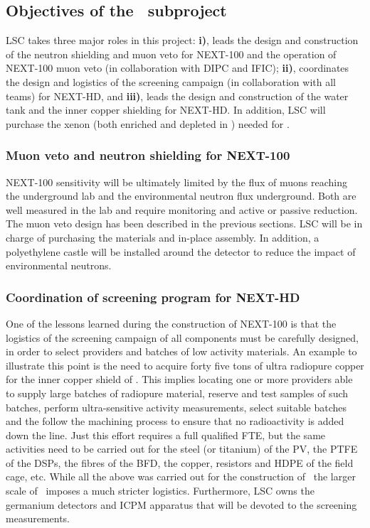 \subsection{Objectives of the \sLSC\ subproject}
\label{sec.obj.lsc}

LSC takes three major roles in this project: {\bf i)},  leads the design and construction of the neutron shielding and muon veto 
for NEXT-100 and the operation of NEXT-100 muon veto (in collaboration with DIPC and IFIC); {\bf ii)}, coordinates the design and logistics of the 
screening campaign (in collaboration with all teams) for NEXT-HD, and {\bf iii)}, leads the design
and construction of the water tank and the inner copper shielding for NEXT-HD. In addition, LSC will 
purchase the xenon (both enriched and depleted  in \XE) needed for \NHD. 

\subsubsection*{Muon veto and neutron shielding for NEXT-100}

NEXT-100 sensitivity will be ultimately limited by the flux of muons reaching the underground lab and the environmental neutron flux 
underground. Both are well measured in the lab and require monitoring and active or passive reduction. The muon veto design has been described in the previous sections. LSC will be in charge of purchasing the materials and in-place assembly. In addition, a polyethylene castle will be installed around the 
detector to reduce the impact of environmental neutrons.

\subsubsection*{Coordination of screening program for NEXT-HD}

One of the lessons learned during the construction of NEXT-100 is that the logistics of the screening campaign of all components must be carefully designed, in order to select providers and batches of low activity materials. An example to illustrate this point is the need to acquire forty five tons of ultra radiopure copper for the inner copper shield of \NHD. This implies locating one or more providers able to supply large batches of radiopure material, reserve and test samples of such batches, perform ultra-sensitive activity measurements, select suitable batches and the follow the machining process to ensure that no radioactivity is added down the line. Just this effort requires a full qualified FTE, but the same activities need to be carried out for the steel (or titanium) of the PV, the PTFE of the DSPs, the fibres of the BFD, the copper, resistors and HDPE of the field cage, etc. While all the above was carried out for the construction of \Next\ the larger scale of \NHD\ imposes a much stricter logistics. Furthermore, LSC owns the germanium detectors and ICPM apparatus that will be devoted to the screening measurements.

